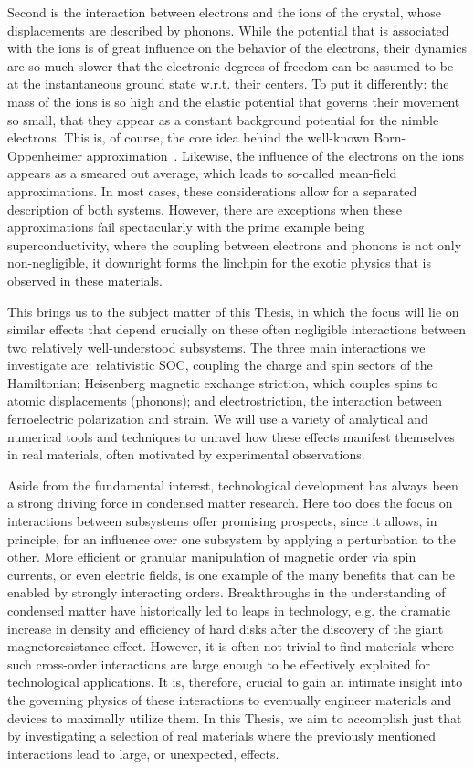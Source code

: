 Second is the interaction between electrons and the ions of the crystal, whose displacements are described by phonons.
While the potential that is associated with the ions is of great influence on the behavior of the electrons, their dynamics are so much slower that the electronic degrees of freedom can be assumed to be at the instantaneous ground state w.r.t. their centers.
To put it differently: the mass of the ions is so high and the elastic potential that governs their movement so small, that they appear as a constant background potential for the nimble electrons.
This is, of course, the core idea behind the well-known Born-Oppenheimer approximation~\cite{Born1927}.
Likewise, the influence of the electrons on the ions appears as a smeared out average, which leads to so-called mean-field approximations.
In most cases, these considerations allow for a separated description of both systems.
However, there are exceptions when these approximations fail spectacularly with the prime example being superconductivity, where the coupling between electrons and phonons is not only non-negligible, it downright forms the linchpin for the exotic physics that is observed in these materials.

This brings us to the subject matter of this Thesis, in which the focus will lie on similar effects that depend crucially on these often negligible interactions between two relatively well-understood subsystems.
The three main interactions we investigate are: relativistic \gls{SOC}, coupling the charge and spin sectors of the Hamiltonian; Heisenberg magnetic exchange striction, which couples spins to atomic displacements (phonons); and electrostriction, the interaction between ferroelectric polarization and strain.
We will use a variety of analytical and numerical tools and techniques to unravel how these effects manifest themselves in real materials, often motivated by experimental observations.

Aside from the fundamental interest, technological development has always been a strong driving force in condensed matter research. Here too does the focus on interactions between subsystems offer promising prospects, since it allows, in principle, for an influence over one subsystem by applying a perturbation to the other.
More efficient or granular manipulation of magnetic order via spin currents, or even electric fields, is one example of the many benefits that can be enabled by strongly interacting orders.
Breakthroughs in the understanding of condensed matter have historically led to leaps in technology, e.g. the dramatic increase in density and efficiency of hard disks after the discovery of the giant magnetoresistance effect.
However, it is often not trivial to find materials where such cross-order interactions are large enough to be effectively exploited for technological applications.
It is, therefore, crucial to gain an intimate insight into the governing physics of these interactions to eventually engineer materials and devices to maximally utilize them.
In this Thesis, we aim to accomplish just that by investigating a selection of real materials where the previously mentioned interactions lead to large, or unexpected, effects.

